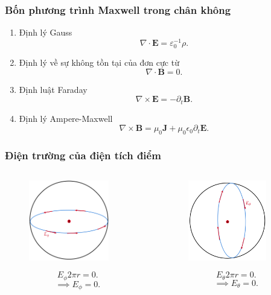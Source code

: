 \begin{frame}
    \frametitle{Bốn phương trình Maxwell trong chân không}
    \begin{enumerate}
        \item  Định lý Gauss \[\nabla\cdot\mathbf{E}=\varepsilon_{0}^{-1}\rho .\]
        \item  Định lý về sự không tồn tại của đơn cực từ \[\nabla\cdot\mathbf{B}=0.\]
        \item  Định luật Faraday\[\nabla\times\mathbf{E}=-\partial_t \mathbf{B}.\]
        \item Định lý Ampere-Maxwell \[\nabla\times\mathbf{B}=\mu_0 \mathbf{J}+\mu_0\epsilon_0 \partial_t \mathbf{E}.\] 
    \end{enumerate}
\end{frame}
\begin{frame}
    \frametitle{Điện trường của điện tích điểm }
    \begin{columns}
        \begin{column}{0.3\textwidth}
            \begin{figure}
                \centering
                \includegraphics[width=3.5cm, height=3.5cm]{Content/Figure/azimuthal_field.png}
            \end{figure}
            \[E_{\phi}2\pi r =0.\] \[\implies E_{\phi}=0.\]
        \end{column}
        \begin{column}{0.3\textwidth}
            \begin{figure}
                \centering
                \includegraphics[width=3.5cm, height=3.5cm]{Content/Figure/theta_field.png}
            \end{figure}
            \[E_{\theta}2\pi r =0.\] \[\implies E_{\theta}=0.\]
        \end{column}

\end{columns}
\end{frame}
